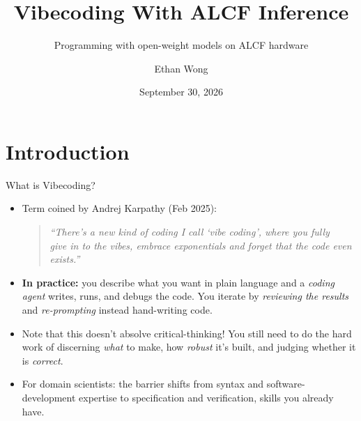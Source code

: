 \documentclass[10pt,aspectratio=169]{beamer}
\title{Vibecoding With ALCF Inference}
\subtitle{Programming with open-weight models on ALCF hardware}
\date{September 30, 2026}
\author{Ethan Wong}
\begin{document}
\begin{frame}[plain]
\maketitle
\end{frame}

\section{Introduction}

\begin{frame}{What is Vibecoding?}
  \begin{itemize}
    \item Term coined by Andrej Karpathy (Feb 2025):
      \pause
    \begin{quote}\small\itshape
      \enquote{There's a new kind of coding I call \enquote*{vibe coding},
	    where you fully \\ give in to the vibes, embrace exponentials and
	    forget that the code even exists.}
    \end{quote}
      \pause
    \item \textbf{In practice:} you describe what you want in plain language
	    and a \emph{coding agent} writes, runs, and debugs the code. You
		  iterate by \emph{reviewing the results} and
		  \emph{re-prompting} instead hand-writing code.
      \pause
    \item Note that this doesn't absolve critical-thinking! You still need to
	    do the hard work of discerning \emph{what} to make, how
		  \emph{robust} it's built, and judging whether it is
		  \emph{correct}.
      \pause
    \item For domain scientists: the barrier shifts from syntax and
	    software-development expertise to specification and verification,
		  skills you already have.
  \end{itemize}
\end{frame}
\end{document}
